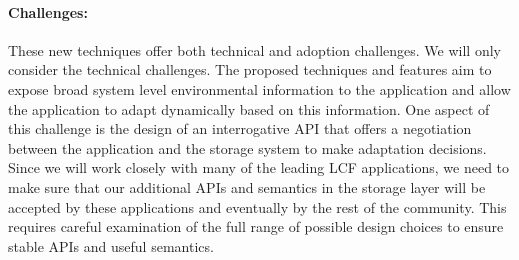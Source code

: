 %

\paragraph{Challenges:}
These new techniques offer both technical and adoption challenges. We will only
consider the technical challenges. The proposed techniques and features aim to
expose broad system level environmental information to the application and
allow the application to adapt dynamically based on this information.  One
aspect of this challenge is the design of an interrogative API that offers a
negotiation between the application and the storage system to make adaptation
decisions.  Since we will work closely with many of the leading LCF
applications, we need to make sure that our additional APIs and semantics in
the storage layer will be accepted by these applications and eventually by the
rest of the community. This requires careful examination of the full range
of possible
design choices to ensure stable APIs and useful semantics.


